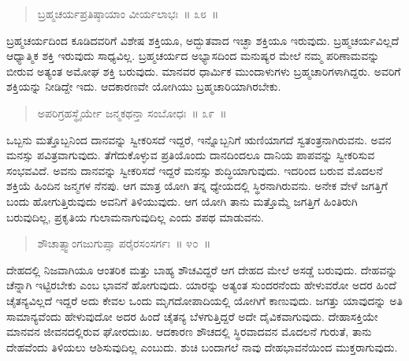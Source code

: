 \begin{verse}
ಬ್ರಹ್ಮಚರ್ಯಪ್ರತಿಷ್ಠಾಯಾಂ ವೀರ್ಯಲಾಭಃ~॥ ೩೮~॥
\end{verse}

\vspace{-0.4cm}


\vspace{0.2cm}

ಬ್ರಹ್ಮಚರ್ಯದಿಂದ ಕೂಡಿದವರಿಗೆ ವಿಶೇಷ ಶಕ್ತಿಯೂ, ಅದ್ಭುತವಾದ ಇಚ್ಛಾ ಶಕ್ತಿಯೂ ಇರುವುದು. ಬ್ರಹ್ಮಚರ್ಯವಿಲ್ಲದೆ ಆಧ್ಯಾತ್ಮಿಕ ಶಕ್ತಿ ಇರುವುದು ಸಾಧ್ಯವಿಲ್ಲ. ಬ್ರಹ್ಮಚರ್ಯದ ಅಭ್ಯಾಸದಿಂದ ಮನುಷ್ಯರ ಮೇಲೆ ನಮ್ಮ ಪರಿಣಾಮವನ್ನು ಬೀರುವ ಅತ್ಯಂತ ಅಮೋಘ ಶಕ್ತಿ ಬರುವುದು. ಮಾನವರ ಧಾರ್ಮಿಕ ಮುಂದಾಳುಗಳು ಬ್ರಹ್ಮಚಾರಿಗಳಾಗಿದ್ದರು. ಅವರಿಗೆ ಶಕ್ತಿಯನ್ನು ನೀಡಿದ್ದೇ ಇದು. ಆದಕಾರಣವೇ ಯೋಗಿಯು ಬ್ರಹ್ಮಚಾರಿಯಾಗಿರಬೇಕು. 

\vspace{-0.2cm}

\begin{verse}
ಅಪರಿಗ್ರಹಸ್ಥೈರ್ಯೇ ಜನ್ಮಕಥನ್ತಾ ಸಂಬೋಧಃ~॥ ೩೯~॥
\end{verse}

\vspace{-0.4cm}


\vspace{0.2cm}

ಒಬ್ಬನು ಮತ್ತೊಬ್ಬನಿಂದ ದಾನವನ್ನು ಸ್ವೀಕರಿಸದೆ ಇದ್ದರೆ, ಇನ್ನೊಬ್ಬನಿಗೆ ಋಣಿಯಾಗದೆ ಸ್ವತಂತ್ರನಾಗಿರುವನು. ಅವನ ಮನಸ್ಸು ಪವಿತ್ರವಾಗುವುದು. ತೆಗೆದುಕೊಳ್ಳುವ ಪ್ರತಿಯೊಂದು ದಾನದಿಂದಲೂ ದಾನಿಯ ಪಾಪವನ್ನು ಸ್ವೀಕರಿಸುವ ಸಂಭವವಿದೆ. ಅವನು ದಾನವನ್ನು ಸ್ವೀಕರಿಸದೆ ಇದ್ದರೆ ಮನಸ್ಸು ಶುದ್ಧಿಯಾಗುವುದು. ಇದರಿಂದ ಬರುವ ಮೊದಲನೆ ಶಕ್ತಿಯೆ ಹಿಂದಿನ ಜನ್ಮಗಳ ನೆನಪು. ಆಗ ಮಾತ್ರ ಯೋಗಿ ತನ್ನ ಧ್ಯೇಯದಲ್ಲಿ ಸ್ಥಿರನಾಗಿರುವನು. ಅನೇಕ ವೇಳೆ ಜಗತ್ತಿಗೆ ಬಂದು ಹೋಗುತ್ತಿರುವುದು ಅವನಿಗೆ ತಿಳಿಯುವುದು. ಆಗ ಯೋಗಿ ತಾನು ಮತ್ತೊಮ್ಮೆ ಜಗತ್ತಿಗೆ ಹಿಂತಿರುಗಿ ಬರುವುದಿಲ್ಲ, ಪ್ರಕೃತಿಯ ಗುಲಾಮನಾಗುವುದಿಲ್ಲ ಎಂದು ಶಪಥ ಮಾಡುವನು. 

\vspace{-0.2cm}

\begin{verse}
ಶೌಚಾತ್ಸ್ವಾಂಗಜುಗುಪ್ಸಾ ಪರೈರಸಂಸರ್ಗಃ~॥ ೪೦~॥
\end{verse}

\vspace{-0.4cm}


\vspace{0.2cm}

ದೇಹದಲ್ಲಿ ನಿಜವಾಗಿಯೂ ಆಂತರಿಕ ಮತ್ತು ಬಾಹ್ಯ ಶೌಚವಿದ್ದರೆ ಆಗ ದೇಹದ ಮೇಲೆ ಅಸಡ್ಡೆ ಬರುವುದು. ದೇಹವನ್ನು ಚೆನ್ನಾಗಿ ಇಟ್ಟಿರಬೇಕು ಎಂಬ ಭಾವನೆ ಹೋಗುವುದು. ಯಾರನ್ನು ಅತ್ಯಂತ ಸುಂದರನೆಂದು ಹೇಳುವರೋ ಅದರ ಹಿಂದೆ ಚೈತನ್ಯವಿಲ್ಲದೆ ಇದ್ದರೆ ಅದು ಕೇವಲ ಒಂದು ಮೃಗದೋಪಾದಿಯಲ್ಲಿ ಯೋಗಿಗೆ ಕಾಣುವುದು. ಜಗತ್ತು ಯಾವುದನ್ನು ಅತಿ ಸಾಮಾನ್ಯವೆಂದು ಹೇಳುವುದೋ ಅದರ ಹಿಂದೆ ಚೈತನ್ಯ ಬೆಳಗುತ್ತಿದ್ದರೆ ಅದೇ ದೈವಿಕವಾಗುವುದು. ದೇಹಾಸಕ್ತಿಯೇ ಮಾನವನ ಜೀವನದಲ್ಲಿರುವ ಘೋರದುಃಖ. ಆದಕಾರಣ ಶೌಚದಲ್ಲಿ ಸ್ಥಿರವಾದವನ ಮೊದಲನೆ ಗುರುತೆ, ತಾನು ದೇಹವೆಂದು ತಿಳಿಯಲು ಆಶಿಸುವುದಿಲ್ಲ ಎಂಬುದು. ಶುಚಿ ಬಂದಾಗಲೆ ನಾವು ದೇಹಭಾವನೆಯಿಂದ ಮುಕ್ತರಾಗುವುದು. 

